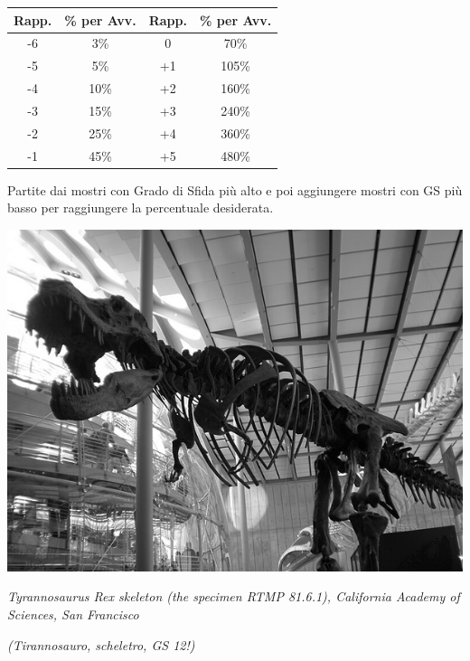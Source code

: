 \begin{multicols}{2}
\begin{enumerate}[leftmargin=*]
\noindent\begin{tabularx}{0.95\linewidth}{c|c|c|c}
\textbf{Rapp.} & \textbf{\% per Avv.} &\textbf{Rapp.} & \textbf{\% per Avv.}\\
\toprule
-6 & 3\% &  0 & 70\% \\
-5 & 5\% & +1 & 105\% \\
-4 & 10\% & +2 & 160\% \\
-3 & 15\% & +3 & 240\% \\
-2 & 25\% & +4 & 360\% \\
-1 & 45\% & +5 & 480\% \\
\end{tabularx}

Partite dai mostri con Grado di Sfida più alto e poi aggiungere mostri con GS più basso per raggiungere la percentuale desiderata.

\end{enumerate}

\end{multicols}

\vfill

\begin{center}
\includegraphics[width=0.6\linewidth]{immagini/trex.png}

\emph{Tyrannosaurus Rex skeleton (the specimen RTMP 81.6.1), California Academy of Sciences, San Francisco}

\emph{(Tirannosauro, scheletro, GS 12!)}
\end{center}



\pagebreak

